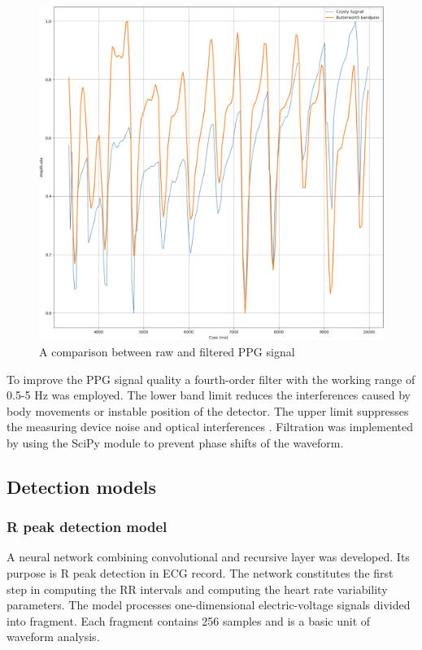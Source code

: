 \documentclass[journal]{IEEEtran}
\begin{document}
\begin{figure}[htbp]
    \centering
    \includegraphics[width=0.76\linewidth]{Filtr_PPG.png} 
    \caption{A comparison between raw and filtered PPG signal}
    \label{fig:filtr_ppg}
\end{figure}

To improve the PPG signal quality a fourth-order filter with the working range of 0.5-5 Hz was employed. The lower band limit reduces the interferences caused by body movements or instable position of the detector. The upper limit suppresses the measuring device noise and optical interferences \cite{26}. Filtration was implemented by using the SciPy module to prevent phase shifts of the waveform.

\newpage
\subsection{Detection models}
\subsubsection{R peak detection model}
A neural network combining convolutional and recursive layer was developed. Its purpose is R peak detection in ECG record. The network constitutes the first step in computing the RR intervals and computing the heart rate variability parameters. The model processes one-dimensional electric-voltage signals divided into fragment. Each fragment contains 256 samples and is a basic unit of waveform analysis.
\end{document}
